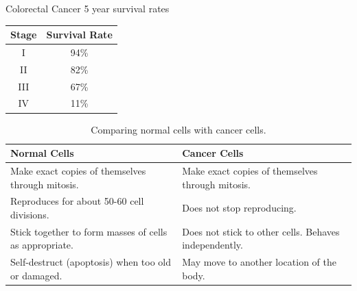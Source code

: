 \documentclass[12pt]{report}
\begin{document}
\begin{table}[h!] %

    \renewcommand{\arraystretch}{1.5} %
    \setlength{\tabcolsep}{10pt} %
    \setlength{\arrayrulewidth}{0.25mm}

    \begin{center}
        Colorectal Cancer 5 year survival rates \\
        \vspace{0.5em}
        \begin{tabular}{|c c|} %
        \hline
        Stage & Survival Rate \\ %
        \hline
        I & 94\% \\ %
        \hline
        II & 82\%\\ 
        \hline 
        III & 67\% \\ 
        \hline 
        IV & 11\%\\ 
        \hline
        \end{tabular}
    \end{center}
\end{table}

\begin{table}[h!]
    \renewcommand{\arraystretch}{1.5}
    \setlength{\tabcolsep}{10pt}
    \setlength{\arrayrulewidth}{0.25mm}

    \begin{center}
        \vspace{0.5em}
        \begin{tabular}{|p{}|p{}|}
        \hline
        \textbf{Normal Cells} & \textbf{Cancer Cells}\\ 
        \hline
        Make exact copies of themselves through mitosis. & Make exact copies of themselves through mitosis. \\
        \hline
        Reproduces for about 50-60 cell divisions. & Does not stop reproducing.\\ 
        \hline 
        Stick together to form masses of cells as appropriate. & Does not stick to other cells. Behaves independently.\\ 
        \hline 
        Self-destruct (apoptosis) when too old or damaged. & May move to another location of the body.\\ 
        \hline
    \end{tabular}
\end{center}
    \caption{Comparing normal cells with cancer cells.}
    \label{table:cancer-vs-normal}
\end{table}
\end{document}
